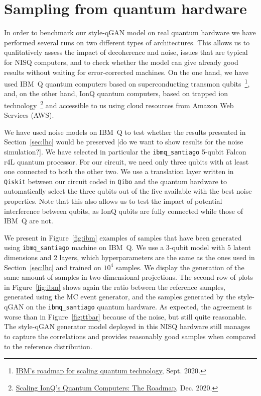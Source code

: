 \documentclass[twocolumn,preprintnumbers,superscriptaddress]{revtex4-2}
\begin{document}
\section{Sampling from quantum hardware}
\label{sec:deployment}

In order to benchmark our style-qGAN model on real quantum hardware we
have performed several runs on two different types of
architectures. This allows us to qualitatively assess the impact of
decoherence and noise, issues that are typical for NISQ computers, and
to check whether the model can give already good results without
waiting for error-corrected machines. On the one hand, we have used IBM~Q
quantum computers based on superconducting transmon
qubits~\footnote{\href{https://research.ibm.com/blog/ibm-quantum-roadmap}{IBM's roadmap for scaling quantum technology}, Sept. 2020.}, and, on the other hand, IonQ quantum computers, based on trapped ion technology~\footnote{\href{https://IonQ.com/posts/december-09-2020-scaling-quantum-computer-roadmap}{Scaling IonQ's Quantum Computers: The Roadmap}, Dec. 2020.} and
accessible to us using cloud resources from Amazon Web Services
(AWS).

{\color{red}We have used noise models on IBM~Q to test whether the results
presented in Section~\ref{sec:lhc} would be preserved [do we want to
show results for the noise simulation?].} We have
selected in particular the {\tt ibmq\_santiago} 5-qubit Falcon r4L quantum processor.
For our circuit, we need only three qubits with at least one connected to both the other two.
We use a translation layer written in \texttt{Qiskit} between our circuit coded in \texttt{Qibo} and the quantum hardware to automatically select the three qubits out of the five available with the best noise properties.
Note that this also allows
us to test the impact of potential interference between qubits, as
IonQ qubits are fully connected while those of IBM~Q are
not.

We present in Figure~\ref{fig:ibm} examples of samples that have been
generated using {\tt ibmq\_santiago} machine on IBM~Q. We use a 3-qubit
model with 5 latent dimensions and 2 layers, which hyperparameters are
the same as the ones used in Section~\ref{sec:lhc} and trained on
$10^4_{}$ samples. We display the generation of the same amount of
samples in two-dimensional projections. The second row of plots in
Figure~\ref{fig:ibm} shows again the ratio between the reference
samples, generated using the MC event generator, and the samples
generated by the style-qGAN on the {\tt ibmq\_santiago} quantum
hardware. As expected, the agreement is worse than in
Figure~\ref{fig:ttbar} because of the noise, but still quite
reasonable. The
style-qGAN generator model deployed in this NISQ hardware still
manages to capture the correlations and provides reasonably good
samples when compared to the reference distribution.
\end{document}
